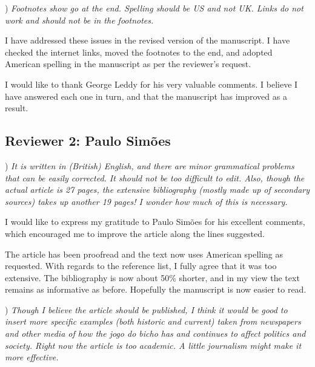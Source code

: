 \documentclass[a4paper,12pt]{article}
\begin{document}
\vspace{.5cm}

) \textit{Footnotes show go at the end. Spelling should be US and not UK. Links do not work and should not be in the footnotes.}

\vspace{.25cm}

I have addressed these issues in the revised version of the manuscript. I have checked the internet links, moved the footnotes to the end, and adopted American spelling in the manuscript as per the reviewer's request.

\vspace{.5cm}

I would like to thank George Leddy for his very valuable comments. I believe I have answered each one in turn, and that the manuscript has improved as a result.


\newpage 

\subsection*{Reviewer 2: Paulo Simões} %
\label{sub:reviewer_2_paulo_simoes}

) \textit{It is written in (British) English, and there are minor grammatical problems that can be easily corrected. It should not be too difficult to edit. Also, though the actual article is 27 pages, the extensive bibliography (mostly made up of secondary sources) takes up another 19 pages! I wonder how much of this is necessary.}

\vspace{.25cm}

I would like to express my gratitude to Paulo Simões for his excellent comments, which encouraged me to improve the article along the lines suggested.

The article has been proofread and the text now uses American spelling as requested. With regards to the reference list, I fully agree that it was too extensive. The bibliography is now about 50\% shorter, and in my view the text remains as informative as before. Hopefully the manuscript is now easier to read.

\vspace{.5cm}

) \textit{Though I believe the article should be published, I think it would be good to insert more specific examples (both historic and current) taken from newspapers and other media of how the jogo do bicho has and continues to affect politics and society. Right now the article is too academic. A little journalism might make it more effective.}
\end{document}
